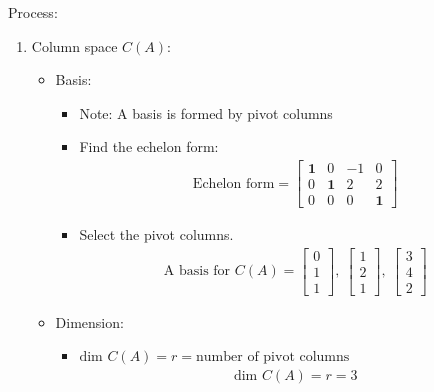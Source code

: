 \documentclass[10pt,a4paper]{article}
\begin{document}
Process:
\begin{enumerate}
    \item Column space $C(A)$:
    \begin{itemize}
        \item Basis:
        \begin{itemize}
            \item Note: A basis is formed by pivot columns 
            \item Find the echelon form:
            \begin{align*}
                \text{Echelon form} = 
                \begin{bmatrix}
                    \textbf{1}&0&-1&0 \\
                    0&\textbf{1}&2&2 \\
                    0&0&0&\textbf{1}
                \end{bmatrix}
            \end{align*}
            \item Select the pivot columns.
            \begin{align*}
                \text{A basis for }C(A) = 
                \begin{bmatrix}
                    0 \\
                    1 \\
                    1
                \end{bmatrix}, \: 
                \begin{bmatrix}
                    1 \\
                    2 \\
                    1
                \end{bmatrix}, \:
                \begin{bmatrix}
                    3 \\
                    4 \\
                    2
                \end{bmatrix}
            \end{align*}
        \end{itemize}
        \item Dimension:
        \begin{itemize}
            \item $\text{dim }C(A) = r = \text{number of pivot columns}$
            \begin{align*}
                \text{dim }C(A) = r = 3
            \end{align*}

\end{itemize}
\end{itemize}
\end{enumerate}
\end{document}
